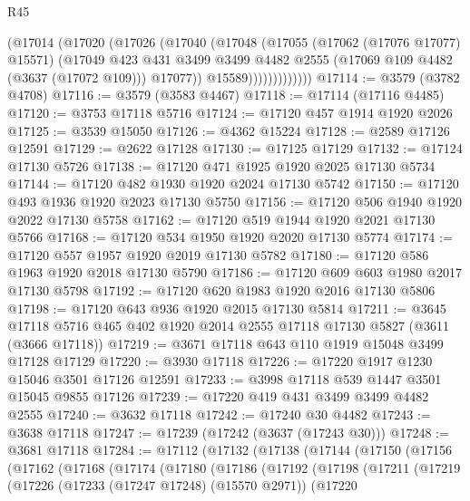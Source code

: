 \begin{lexlean}{R45}
\begin{coremodule}
                    (@17014
                      (@17020
                        (@17026
                          (@17040
                            (@17048
                              (@17055
                                (@17062 (@17076 @17077) @15571)
                                (@17049
                                  @423
                                  @431
                                  @3499
                                  @3499
                                  @4482
                                  @2555
                                  (@17069 @109 @4482 (@3637 (@17072 @109)))
                                  @17077))
                              @15589)))))))))))))
@17114 := @3579 (@3782 @4708)
@17116 := @3579 (@3583 @4467)
@17118 := @17114 (@17116 @4485)
@17120 := @3753 @17118 @5716
@17124 := @17120 @457 @1914 @1920 @2026
@17125 := @3539 @15050
@17126 := @4362 @15224
@17128 := @2589 @17126 @12591
@17129 := @2622 @17128
@17130 := @17125 @17129
@17132 := @17124 @17130 @5726
@17138 := @17120 @471 @1925 @1920 @2025 @17130 @5734
@17144 := @17120 @482 @1930 @1920 @2024 @17130 @5742
@17150 := @17120 @493 @1936 @1920 @2023 @17130 @5750
@17156 := @17120 @506 @1940 @1920 @2022 @17130 @5758
@17162 := @17120 @519 @1944 @1920 @2021 @17130 @5766
@17168 := @17120 @534 @1950 @1920 @2020 @17130 @5774
@17174 := @17120 @557 @1957 @1920 @2019 @17130 @5782
@17180 := @17120 @586 @1963 @1920 @2018 @17130 @5790
@17186 := @17120 @609 @603 @1980 @2017 @17130 @5798
@17192 := @17120 @620 @1983 @1920 @2016 @17130 @5806
@17198 := @17120 @643 @936 @1920 @2015 @17130 @5814
@17211 := @3645 @17118 @5716 @465 @402 @1920 @2014 @2555 @17118 @17130 @5827 (@3611 (@3666 @17118))
@17219 := @3671 @17118 @643 @110 @1919 @15048 @3499 @17128 @17129
@17220 := @3930 @17118
@17226 := @17220 @1917 @1230 @15046 @3501 @17126 @12591
@17233 := @3998 @17118 @539 @1447 @3501 @15045 @9855 @17126
@17239 := @17220 @419 @431 @3499 @3499 @4482 @2555
@17240 := @3632 @17118
@17242 := @17240 @30 @4482
@17243 := @3638 @17118
@17247 := @17239 (@17242 (@3637 (@17243 @30)))
@17248 := @3681 @17118
@17284 := @17112
    (@17132
      (@17138
        (@17144
          (@17150
            (@17156
              (@17162
                (@17168
                  (@17174
                    (@17180
                      (@17186
                        (@17192
                          (@17198
                            (@17211
                              (@17219
                                (@17226
                                  (@17233 (@17247 @17248) (@15570 @2971))
                                  (@17220

\end{coremodule}
\end{lexlean}
